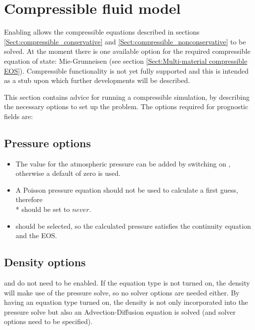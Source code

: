 \section{Compressible fluid model}

Enabling  allows the compressible equations described in sections 
\ref{Sect:compressible_conservative} and \ref{Sect:compressible_nonconservative} to be solved. At the moment there is one available option for the required 
compressible equation of state: Mie-Grunneisen (see section \ref{Sect:Multi-material compressible EOS}).  Compressible functionality is not yet fully supported and this is intended as a stub upon which further developments will be described.

This section contains advice for running a compressible simulation, by describing the necessary options to set up the problem. The options required for prognostic fields are:

\subsection{Pressure options}
\begin{itemize}
\item The value for the atmospheric pressure can be added by switching on , otherwise a default of zero is used.
\item A Poisson pressure equation should not be used to calculate a first guess, therefore \\*  should be set to $never$.
\item {} should be selected, so the calculated pressure satisfies the continuity equation and the EOS.
\end{itemize}

\subsection{Density options}
 and  do not need to be enabled. If the equation type is not turned on, the density will make 
use of the pressure solve, so no solver options are needed either. By having an equation type turned on, the density is not only incorporated into the pressure solve 
but also an Advection-Diffusion equation is solved (and solver options need to be specified).

